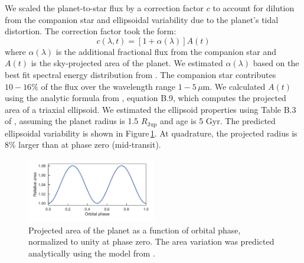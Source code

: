 \documentclass[twocolumn]{aastex61}
\begin{document}
We scaled the planet-to-star flux by a correction factor $c$ to account for dilution from the companion star and ellipsoidal variability due to the planet's tidal distortion. The correction factor took the form: 
\begin{equation}
	c(\lambda, t) = [1 + \alpha(\lambda)]A(t)
\end{equation}
where $\alpha(\lambda)$ is the additional fractional flux from the companion star and $A(t)$ is the sky-projected area of the planet. We estimated $\alpha(\lambda)$ based on the best fit spectral energy distribution from \cite{cartier17}. The companion star contributes $10-16\%$ of the flux over the wavelength range $1 - 5\,\mu$m.  We calculated $A(t)$ using the analytic formula from \cite{leconte11b}, equation B.9, which computes the projected area of a triaxial ellipsoid. We estimated the ellipsoid properties using Table B.3 of \cite{leconte11a}, assuming the planet radius is 1.5 $R_\mathrm{Jup}$ and age is 5 Gyr. The predicted ellipsoidal variability is shown in Figure\,\ref{fig:ellipsoidal}. At quadrature, the projected radius is $8\%$ larger than at phase zero (mid-transit). %




\begin{figure}
\includegraphics[width = 0.5\textwidth]{Figures/ellipsoidal.pdf}
\caption{Projected area of the planet as a function of orbital phase, normalized to unity at phase zero. The area variation was predicted analytically using the model from \cite{leconte11b}.}
\label{fig:ellipsoidal}
\end{figure}
\end{document}
